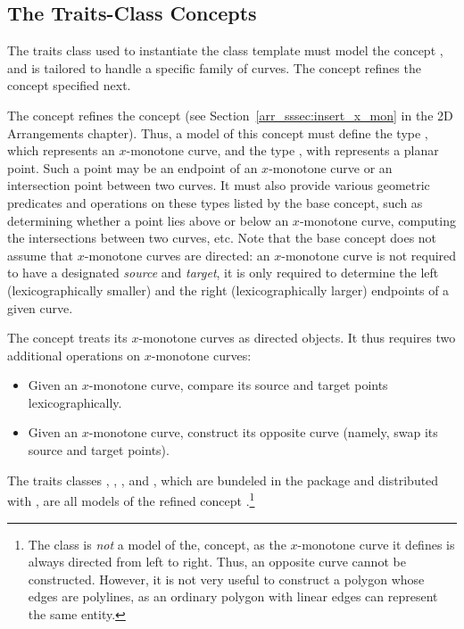 \subsection{The Traits-Class Concepts}
\label{bso_ssec:traits_concepts}

The traits class used to instantiate the 
class template must model the concept ,
and is tailored to handle a specific family of curves. The concept
 refines the concept
 specified next.

The concept  refines the 
concept  (see 
Section~\ref{arr_sssec:insert_x_mon} in the 2D Arrangements chapter).
Thus, a model of this concept must define the type , 
which represents an $x$-monotone curve, and the type , 
with represents a planar point. Such a point may be an endpoint of an
$x$-monotone curve or an intersection point between two curves.
It must also provide various geometric predicates and operations 
on these types listed by the base concept, such as determining whether
a point lies above or below an $x$-monotone curve, computing the
intersections between two curves, etc. Note that the base concept does
not assume that $x$-monotone curves are directed: an $x$-monotone
curve is not required to have a designated {\em source} and {\em
target}, it is only required to determine the left (lexicographically
smaller) and the right (lexicographically larger) endpoints of a given
curve.

The  concept treats its
$x$-monotone curves as directed objects. It thus requires two additional
operations on $x$-monotone curves:
\begin{itemize}
\item Given an $x$-monotone curve, compare its source and target points
lexicographically.
\item Given an $x$-monotone curve, construct its opposite curve (namely,
swap its source and target points).
\end{itemize}

The traits classes , 
, ,
 and , which are 
bundeled in the  package and distributed with \cgal,
are all models of the refined concept 
.\footnote{The
 class is {\em not} a model of the, 
 concept, as the
$x$-monotone curve it defines is always directed from left to
right. Thus, an opposite curve cannot be constructed. However, it is
not very useful to construct a polygon whose edges are polylines, as
an ordinary polygon with linear edges can represent the same entity.}

